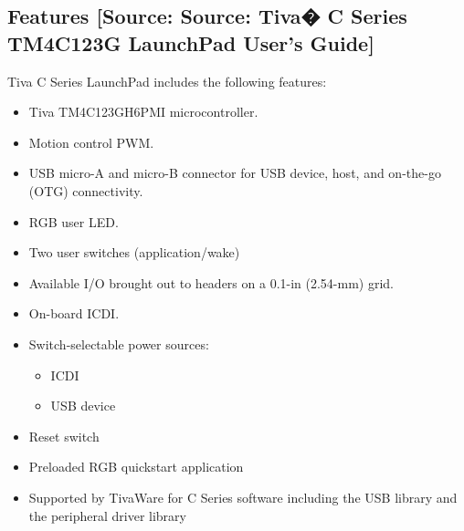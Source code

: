 \documentclass[a4paper,12pt,oneside]{book}
\begin{document}
\subsection{Features [Source: Source: Tiva� C Series TM4C123G LaunchPad User's Guide]}
Tiva C Series LaunchPad includes the following features:
\begin{itemize}
    \item Tiva TM4C123GH6PMI microcontroller.
    \item Motion control PWM.
    \item USB micro-A and micro-B connector for USB device, host, and on-the-go (OTG) connectivity.
    \item RGB user LED.
    \item Two user switches (application/wake)
    \item Available I/O brought out to headers on a 0.1-in (2.54-mm) grid.
    \item On-board ICDI.
    \item Switch-selectable power sources:
    \begin{itemize}
      \item  ICDI
       \item USB device
\end{itemize}
\item Reset switch
\item Preloaded RGB quickstart application
\item Supported by TivaWare for C Series software including the USB library and the peripheral driver library
\end{itemize}
\newpage
\end{document}
